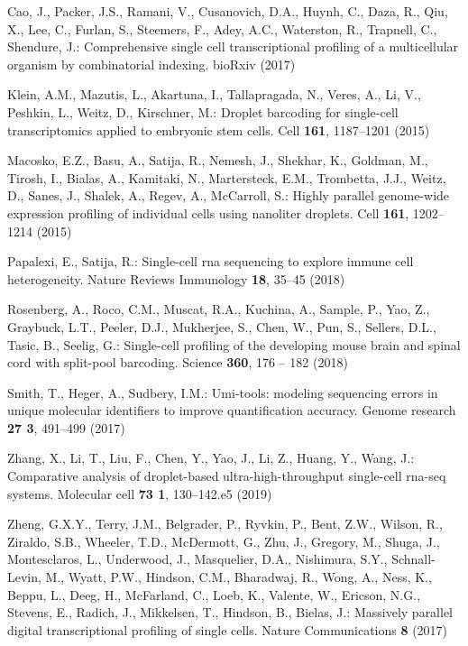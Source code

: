\documentclass[runningheads]{llncs}
\begin{document}
\begin{thebibliography}{8}
Cao, J., Packer, J.S., Ramani, V., Cusanovich, D.A., Huynh, C., Daza, R., Qiu,
  X., Lee, C., Furlan, S., Steemers, F., Adey, A.C., Waterston, R., Trapnell,
  C., Shendure, J.: Comprehensive single cell transcriptional profiling of a
  multicellular organism by combinatorial indexing. bioRxiv  (2017)

Klein, A.M., Mazutis, L., Akartuna, I., Tallapragada, N., Veres, A., Li, V.,
  Peshkin, L., Weitz, D., Kirschner, M.: Droplet barcoding for single-cell
  transcriptomics applied to embryonic stem cells. Cell  \textbf{161},
  1187--1201 (2015)

Macosko, E.Z., Basu, A., Satija, R., Nemesh, J., Shekhar, K., Goldman, M.,
  Tirosh, I., Bialas, A., Kamitaki, N., Martersteck, E.M., Trombetta, J.J.,
  Weitz, D., Sanes, J., Shalek, A., Regev, A., McCarroll, S.: Highly parallel
  genome-wide expression profiling of individual cells using nanoliter
  droplets. Cell  \textbf{161},  1202--1214 (2015)

Papalexi, E., Satija, R.: Single-cell rna sequencing to explore immune cell
  heterogeneity. Nature Reviews Immunology  \textbf{18},  35--45 (2018)

Rosenberg, A., Roco, C.M., Muscat, R.A., Kuchina, A., Sample, P., Yao, Z.,
  Graybuck, L.T., Peeler, D.J., Mukherjee, S., Chen, W., Pun, S., Sellers,
  D.L., Tasic, B., Seelig, G.: Single-cell profiling of the developing mouse
  brain and spinal cord with split-pool barcoding. Science  \textbf{360},  176
  -- 182 (2018)

Smith, T., Heger, A., Sudbery, I.M.: Umi-tools: modeling sequencing errors in
  unique molecular identifiers to improve quantification accuracy. Genome
  research  \textbf{27 3},  491--499 (2017)

Zhang, X., Li, T., Liu, F., Chen, Y., Yao, J., Li, Z., Huang, Y., Wang, J.:
  Comparative analysis of droplet-based ultra-high-throughput single-cell
  rna-seq systems. Molecular cell  \textbf{73 1},  130--142.e5 (2019)

Zheng, G.X.Y., Terry, J.M., Belgrader, P., Ryvkin, P., Bent, Z.W., Wilson, R.,
  Ziraldo, S.B., Wheeler, T.D., McDermott, G., Zhu, J., Gregory, M., Shuga, J.,
  Montesclaros, L., Underwood, J., Masquelier, D.A., Nishimura, S.Y.,
  Schnall-Levin, M., Wyatt, P.W., Hindson, C.M., Bharadwaj, R., Wong, A., Ness,
  K., Beppu, L., Deeg, H., McFarland, C., Loeb, K., Valente, W., Ericson, N.G.,
  Stevens, E., Radich, J., Mikkelsen, T., Hindson, B., Bielas, J.: Massively
  parallel digital transcriptional profiling of single cells. Nature
  Communications  \textbf{8} (2017)


\end{thebibliography}
\end{document}
